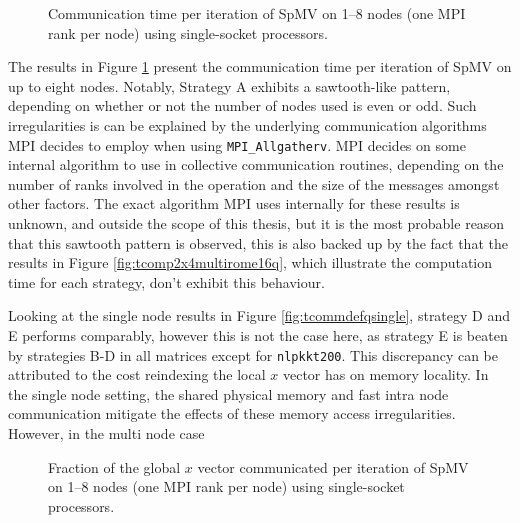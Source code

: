 \begin{figure}[H]
    \centering
    \caption{Communication time per iteration of SpMV on 1–8 nodes (one MPI rank per node) using single-socket \romeq{} processors.}
    \label{fig:tcommromemulti}
\end{figure}

The results in Figure \ref{fig:tcommromemulti} present the communication time per iteration of SpMV on up to eight \romeq{} nodes. Notably, Strategy A exhibits a sawtooth-like pattern, depending on whether or not the number of nodes used is even or odd. Such irregularities is can be explained by the underlying communication algorithms MPI decides to employ when using \texttt{MPI\_Allgatherv}. MPI decides on some internal algorithm to use in collective communication routines, depending on the number of ranks involved in the operation and the size of the messages amongst other factors. The exact algorithm MPI uses internally for these results is unknown, and outside the scope of this thesis, but it is the most probable reason that this sawtooth pattern is observed, this is also backed up by the fact that the results in Figure \ref{fig:tcomp2x4multirome16q}, which illustrate the computation time for each strategy, don't exhibit this behaviour.
\medskip

Looking at the single node results in Figure \ref{fig:tcommdefqsingle}, strategy D and E performs comparably, however this is not the case here, as strategy E is beaten by strategies B-D in all matrices except for \texttt{nlpkkt200}. This discrepancy can be attributed to the cost reindexing the local \(x\) vector has on memory locality. In the single node setting, the shared physical memory and fast intra node communication mitigate the effects of these memory access irregularities. However, in the multi node case 

\begin{figure}[H]
    \centering
    \caption{Fraction of the global \(x\) vector communicated per iteration of SpMV on 1–8 nodes (one MPI rank per node) using single-socket \romeq{} processors.}
    \label{fig:commlaoadromemulti}
\end{figure}
